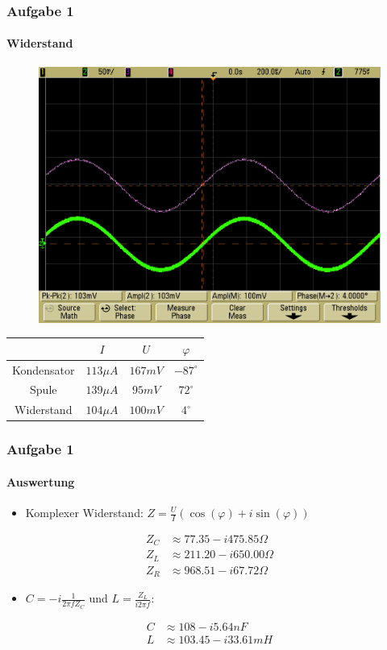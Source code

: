 \begin{frame}
\frametitle{Aufgabe 1}
\framesubtitle{Widerstand}
\begin{figure}[H]
    \begin{center}
                \includegraphics[scale=0.15]{./img/1c_Widerstand.png}
    \end{center}
\end{figure}
\begin{center}
\begin{tabular}{c|| c | c | c}
    & $I$ & $U$ & $\varphi$ \\
    \hline
    Kondensator & $113 \mu A$ & $167mV$ & $-87^{\circ}$ \\
    Spule & $139 \mu A$ & $95 mV$ & $72^{\circ}$  \\
    Widerstand & $104 \mu A$ & $100 mV$ & $4^{\circ}$
\end{tabular}
\end{center}
\end{frame}
\begin{frame}
\frametitle{Aufgabe 1}
\framesubtitle{Auswertung}
\begin{itemize}
    \item Komplexer Widerstand: $Z = \frac{U}{I} \left( \cos (\varphi) + i \sin
    (\varphi) \right) $
\end{itemize}
\begin{align*}
    Z_C &\approx 77.35 - i475.85 \Omega \\
    Z_L &\approx 211.20 - i650.00 \Omega \\
    Z_R &\approx 968.51 - i 67.72 \Omega 
\end{align*}
\pause
\begin{itemize}
    \item $C = -i \frac{1}{2\pi f Z_C}$ und $L = \frac{Z_L}{i2\pi f}$:
\end{itemize}
\begin{align*}
    C &\approx 108 - i5.64nF \\
    L &\approx 103.45 - i33.61 mH
\end{align*}
\end{frame}
